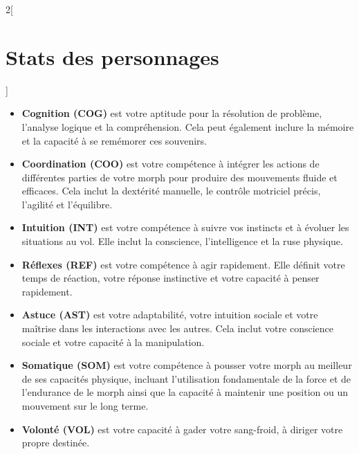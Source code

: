 \documentclass[a4paper,9pt]{article}
\begin{document}
\begin{multicols}{2}[\section{Stats des personnages} \label{sec:character-stats}]
\begin{itemize}
\item \textbf{Cognition (COG)} est votre aptitude pour la résolution de
problème, l'analyse logique et la compréhension. Cela peut également inclure la
mémoire et la capacité à se remémorer ces souvenirs.
\item \textbf{Coordination (COO)} est votre compétence à intégrer les actions
de différentes parties de votre morph pour produire des mouvements fluide et
efficaces. Cela inclut la dextérité manuelle, le contrôle motriciel précis,
l'agilité et l'équilibre.
\item \textbf{Intuition (INT)} est votre compétence à suivre vos instincts et à
évoluer les situations au vol. Elle inclut la conscience, l'intelligence et la
ruse physique.
\item \textbf{Réflexes (REF)} est votre compétence à agir rapidement. Elle
définit votre temps de réaction, votre réponse instinctive et votre capacité à
penser rapidement.
\item \textbf{Astuce (AST)} est votre adaptabilité, votre intuition sociale et
votre maîtrise dans les interactions avec les autres. Cela inclut votre
conscience sociale et votre capacité à la manipulation.
\item \textbf{Somatique (SOM)} est votre compétence à pousser votre morph au
meilleur de ses capacités physique, incluant l'utilisation fondamentale de la
force et de l'endurance de le morph ainsi que la capacité à maintenir une
position ou un mouvement sur le long terme.
\item \textbf{Volonté (VOL)} est votre capacité à gader votre sang-froid, à
diriger votre propre destinée.
\end{itemize} 

\end{multicols}
\end{document}
